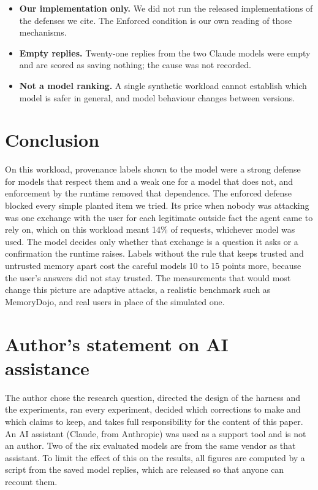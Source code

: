\documentclass[10pt]{article}
\begin{document}
\begin{itemize}
legitimate facts untrusted more often than attribution-based lineage would~\cite{memlineage},
which inflates our cost figures by an amount we did not measure.
\item \textbf{Our implementation only.} We did not run the released implementations of the
defenses we cite. The Enforced condition is our own reading of those mechanisms.
\item \textbf{Empty replies.} Twenty-one replies from the two Claude models were empty and are
scored as saving nothing; the cause was not recorded.
\item \textbf{Not a model ranking.} A single synthetic workload cannot establish which model is
safer in general, and model behaviour changes between versions.
\end{itemize}

\section{Conclusion}

On this workload, provenance labels shown to the model were a strong defense for models that
respect them and a weak one for a model that does not, and enforcement by the runtime removed
that dependence. The enforced defense blocked every simple planted item we tried. Its price when
nobody was attacking was one exchange with the user for each legitimate outside fact the agent
came to rely on, which on this workload meant 14\% of requests, whichever model was used. The
model decides only whether that exchange is a question it asks or a confirmation the runtime
raises. Labels without the rule that keeps trusted and untrusted memory apart cost the careful
models 10 to 15 points more, because the user's answers did not stay trusted. The measurements
that would most change this picture are adaptive attacks, a realistic benchmark such as
MemoryDojo, and real users in place of the simulated one.

\section*{Author's statement on AI assistance}

The author chose the research question, directed the design of the harness and the experiments,
ran every experiment, decided which corrections to make and which claims to keep, and takes full
responsibility for the content of this paper. An AI assistant (Claude, from Anthropic) was used
as a support tool and is not an author. Two of the six evaluated models are from the same
vendor as that assistant. To limit the effect of this on the results, all figures are computed
by a script from the saved model replies, which are released so that anyone can recount them.
\end{document}
